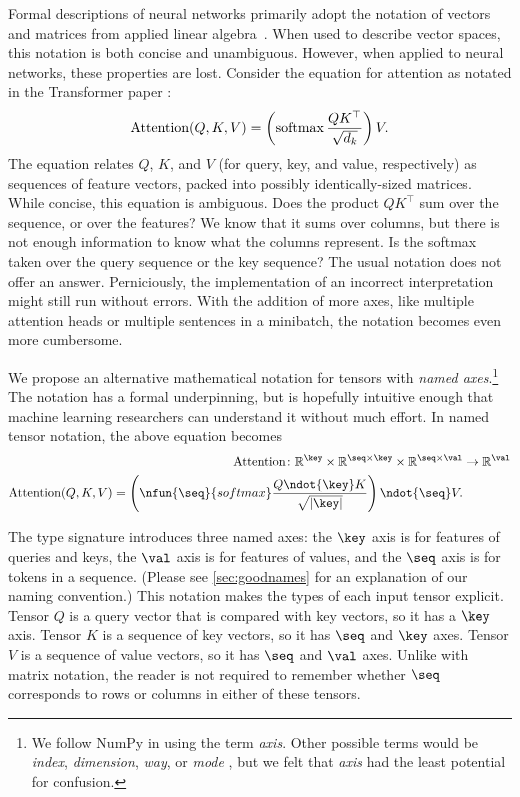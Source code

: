 Formal descriptions of neural networks primarily adopt the notation of vectors and matrices from applied linear algebra~\citep{goodfellow2016deep}. When used to describe vector spaces, this notation is both concise and unambiguous. However, when applied to neural networks, these properties are lost. Consider the equation for attention as notated in the Transformer paper \citep{vaswani+:2017}:
\[ \text{Attention}(Q, K, V) = \left( \operatorname*{softmax} \frac{QK^\top}{\sqrt{d_k}} \right) V. \]
The equation relates $Q$, $K$, and $V$ (for query, key, and value, respectively) as sequences of feature vectors, packed into possibly identically-sized matrices. While concise, this equation is ambiguous. Does the product $QK^\top$ sum over the sequence, or over the features? We know that it sums over columns, but there is not enough information to know what the columns represent. Is the softmax taken over the query sequence or the key sequence? The usual notation does not offer an answer. Perniciously, the implementation of an incorrect interpretation might still run without errors. With the addition of more axes, like multiple attention heads or multiple sentences in a minibatch, the notation becomes even more cumbersome. 

We propose an alternative mathematical notation for tensors with \emph{named axes}.\footnote{%
We follow NumPy in using the term \emph{axis}. Other possible terms would be \emph{index}, \emph{dimension}, \emph{way}, or \emph{mode} \citep{tucker:1964}, but we felt that \emph{axis} had the least potential for confusion.} The notation has a formal underpinning, but is hopefully intuitive enough that machine learning researchers can understand it without much effort. 
%
In named tensor notation, the above equation becomes
\begin{align*}
  \text{Attention} \colon \mathbb{R}^{\key} \times \mathbb{R}^{\seq \times \key} \times \mathbb{R}^{\seq \times\val} &\rightarrow \mathbb{R}^{\val} \\
  \text{Attention}(Q,K,V) = \left( \nfun{\seq}{softmax} \frac{Q \ndot{\key} K}{\sqrt{|\key|}} \right) \ndot{\seq} V.
\end{align*}

The type signature introduces three named axes: the $\key$ axis is for features of queries and keys, the $\val$ axis is for features of values, and the $\seq$ axis is for tokens in a sequence. (Please see \cref{sec:goodnames} for an explanation of our naming convention.) This notation makes the types of each input tensor explicit. Tensor $Q$ is a query vector that is compared with key vectors, so it has a $\key$ axis. Tensor $K$ is a sequence of key vectors, so it has $\seq$ and $\key$ axes. Tensor $V$ is a sequence of value vectors, so it has $\seq$ and $\val$ axes. Unlike with matrix notation, the reader is not required to remember whether $\seq$ corresponds to rows or columns in either of these tensors.


